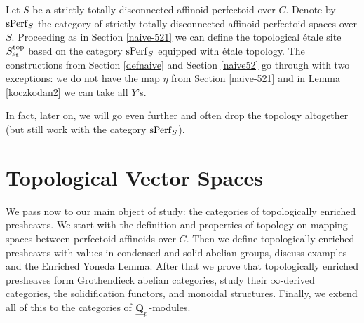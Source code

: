\documentclass[10pt]{amsart}
\theoremstyle{definition}
\theoremstyle{remark}
\newcommand{\eet}{\operatorname{\acute{e}t} }
\numberwithin{equation}{section}
\def\Q{{\bf Q}} \def\Z{{\bf Z}}
\numberwithin{equation}{section}
\begin{document}
  Let $S$ be  a strictly totally disconnected affinoid perfectoid  over $C$. Denote by ${\rm sPerf}_S$ the category of strictly totally disconnected affinoid perfectoid spaces over $S$.  Proceeding as in Section \ref{naive-521} we can define the topological \'etale site $S^{\rm top}_{\eet}$ based on the category ${\rm sPerf}_S$ equipped with \'etale topology.  The constructions from Section \ref{defnaive} and Section \ref{naive52} go through with two exceptions: we do not have the map $\eta$ from Section \ref{naive-521} and 
  in Lemma \ref{koczkodan2} we can take all $Y$'s. 
  
  In fact, later on, we will go even further and often drop the topology altogether (but still work  with the category ${\rm sPerf}_S$). 
  
\section{Topological Vector Spaces} 
We pass now to our main object of study: the categories of topologically enriched presheaves.
We start with the definition and properties of topology on mapping spaces between perfectoid affinoids over $C$. Then we define topologically enriched presheaves with  values in condensed and solid abelian groups, discuss examples and the Enriched Yoneda Lemma. After that we prove that topologically enriched presheaves  form Grothendieck abelian categories, study their $\infty$-derived categories, the solidification functors, and monoidal structures. Finally, we extend all of this to the categories of $\underline{\Q}_p$-modules.
\end{document}
